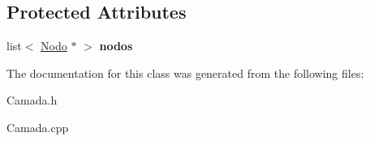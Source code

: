 \subsection*{Protected Attributes}
\begin{DoxyCompactItemize}
\item 
\hypertarget{class_edda_1_1_camada_a77cba40ab2d88d80ed2b4bc8e071799e}{
list$<$ \hyperlink{class_edda_1_1_nodo}{Nodo} $\ast$ $>$ {\bfseries nodos}}
\label{class_edda_1_1_camada_a77cba40ab2d88d80ed2b4bc8e071799e}

\end{DoxyCompactItemize}


The documentation for this class was generated from the following files:\begin{DoxyCompactItemize}
\item 
Camada.h\item 
Camada.cpp\end{DoxyCompactItemize}
